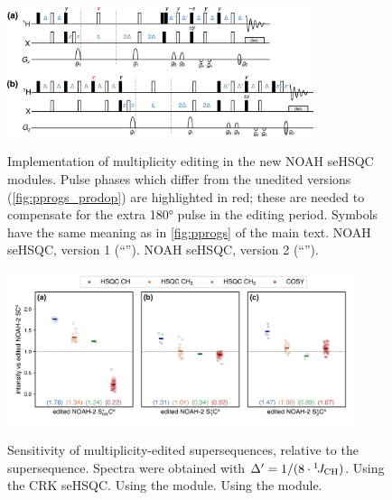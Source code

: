 \begin{figure}
    \centering
    \includegraphics[width=0.8\textwidth]{./figures/mult_edit.png}
    {\label{fig:mult_edit_spv1}}
    {\label{fig:mult_edit_spv2}}
    \caption{
        Implementation of multiplicity editing in the new NOAH seHSQC modules.
        Pulse phases which differ from the unedited versions (\cref{fig:pprogs_prodop}) are highlighted in red; these are needed to compensate for the extra \proton{} \ang{180} pulse in the editing period.
        Symbols have the same meaning as in \cref{fig:pprogs} of the main text.
        \textbf{} NOAH seHSQC, version 1 (``\noahSpa{}'').
        \textbf{} NOAH seHSQC, version 2 (``\noahSpb{}'').
    }
    \label{fig:mult_edit}
\end{figure}

\begin{figure}
    \centering
    \includegraphics[width=0.9\textwidth]{./figures/edited_sn_comp.png}
    {\label{fig:edited_sn_comp_crk}}
    {\label{fig:edited_sn_comp_spv1}}
    {\label{fig:edited_sn_comp_spv2}}
    \caption{
        Sensitivity of multiplicity-edited  supersequences, relative to the  supersequence.
        Spectra were obtained with $\Delta' = 1/(8\cdot\onejch)$.
        \textbf{} Using the CRK seHSQC.
        \textbf{} Using the \noahSpa{} module.
        \textbf{} Using the \noahSpb{} module.
        \andro{}
    }
    \label{fig:edited_sn_comp}
\end{figure}

